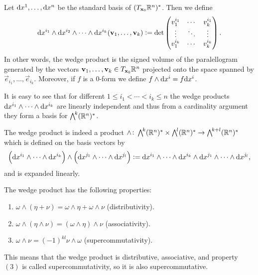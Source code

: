 \documentclass[11pt,a4paper]{article}
\begin{document}
\begin{definition}
  Let $\dx^{1},\dots,\dx^{n}$ be the standard basis
  of $(T_{\boldsymbol{\mathbf{x}}_0} \mathbb{R}^n)^*$.
  Then we define
  \[
    \dx^{i_1} \wedge \dx^{i_2} \wedge \cdots \wedge \dx^{i_k}
    (\vec v_1,\dots,\vec v_k) :=
    \det
    \begin{pmatrix}
      v_1^{i_1} & \cdots & v_k^{i_1} \\
      \vdots & \ddots & \vdots \\
      v_1^{i_k} & \cdots & v_k^{i_k}
    \end{pmatrix}.
  \]
  In other words,
  the wedge product is the signed volume of the paralellogram generated by
  the vectors $\boldsymbol{\mathbf{v}}_1,\dots,\boldsymbol{\mathbf{v}}_k \in T_{\boldsymbol{\mathbf{x}}_0} \mathbb{R}^n$
  projected onto the space spanned by $\vec e_{i_1},\dots,\vec e_{i_k}$.
  Moreover, if $f$ is a $0$-form we define $f \wedge \dx^i = f \dx^i$.
\end{definition}
\begin{remark}
  It is easy to see that for different
  $1 \le i_1 < \cdots < i_k \le n$
  the wedge products $\dx^{i_1} \wedge \cdots \wedge \dx^{i_k}$
  are linearly independent and thus
  from a cardinality argument they form a basis for $\bigwedge^{\!k}(\mathbb{R}^n)^*$.
\end{remark}
\begin{remark}
  The wedge product is indeed a product
  $\wedge \colon \bigwedge^{\!k}(\mathbb{R}^n)^* \times \bigwedge^{\!l}(\mathbb{R}^n)^* \to
  \bigwedge^{\!k+l}(\mathbb{R}^n)^*$
  which is defined on the basis vectors by
  \[
    \del{\dx^{i_1} \wedge \cdots \wedge \dx^{i_k}} \wedge
    \del{\dx^{j_1} \wedge \cdots \wedge \dx^{j_l}} :=
    \dx^{i_1} \wedge \cdots \wedge \dx^{i_k} \wedge
    \dx^{j_1} \wedge \cdots \wedge \dx^{j_l},
  \]
  and is expanded linearly.
\end{remark}

\begin{proposition}
  The wedge product has the following properties:
  \begin{enumerate}
    \item[(1)] $\omega \wedge (\eta + \nu) =
      \omega \wedge \eta + \omega \wedge \nu$ \textnormal{(distributivity)}.
    \item[(2)] $\omega \wedge (\eta \wedge \nu) =
      (\omega \wedge \eta) \wedge \nu$ \textnormal{(associativity)}.
    \item[(3)] $\omega \wedge \nu = (-1)^{kl} \nu \wedge \omega$
      \textnormal{(supercommutativity)}.
  \end{enumerate}
\end{proposition}
\begin{remark}
  This means that the wedge product is distributive, associative,
  and property $(3)$ is called supercommutativity,
  so it is also supercommutative.
\end{remark}
\end{document}
